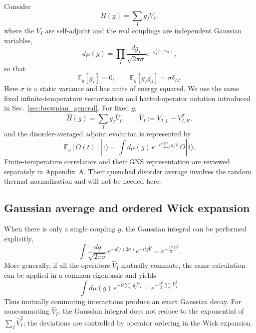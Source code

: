\documentclass{article}
\theoremstyle{definition}
\begin{document}
Consider
\begin{equation}
    H(g)=\sum_I g_IV_I,
\end{equation}
where the $V_I$ are self-adjoint and the real couplings are independent
Gaussian variables,
\begin{equation}
    d\mu(g)
    =\prod_I\frac{dg_I}{\sqrt{2\pi\sigma}}
      e^{-g_I^2/(2\sigma)},
\end{equation}
so that
\begin{equation}
    \mathbb E_g[g_I]=0,
    \qquad
    \mathbb E_g[g_Ig_J]=\sigma\delta_{IJ}.
\end{equation}
Here $\sigma$ is a static variance and has units of energy squared.  We use
the same fixed infinite-temperature vectorization and hatted-operator
notation introduced in Sec.~\ref{sec:brownian_general}.  For fixed $g$,
\begin{equation}
    \widehat H(g)=\sum_Ig_I\widehat V_I,
    \qquad
    \widehat V_I:=V_{I,L}-V_{I,R}^T,
\end{equation}
and the disorder-averaged adjoint evolution is represented by
\begin{equation}
    \mathbb E_g[O(t)]|1\rangle
    =\int d\mu(g)\,
      e^{-it\sum_Ig_I\widehat V_I}O|1\rangle.
\end{equation}
Finite-temperature correlators and their GNS representation are reviewed
separately in Appendix~A.  Their quenched disorder average involves the
random thermal normalization and will not be needed here.

\subsection{Gaussian average and ordered Wick expansion}

When there is only a single coupling $g$, the Gaussian integral can be
performed explicitly,
\begin{equation}
    \int\frac{dg}{\sqrt{2\pi\sigma}}
    e^{-g^2/(2\sigma)}e^{-itg\widehat V}
    =e^{-\frac{\sigma t^2}{2}\widehat V^2}.
\end{equation}
More generally, if all the operators $\widehat V_I$ mutually commute, the
same calculation can be applied in a common eigenbasis and yields
\begin{equation}
    \int d\mu(g)\,
    e^{-it\sum_Ig_I\widehat V_I}
    =
    e^{-\frac{\sigma t^2}{2}\sum_I\widehat V_I^2}.
\end{equation}
Thus mutually commuting interactions produce an exact Gaussian decay.
For noncommuting $\widehat V_I$, the Gaussian integral does not reduce to
the exponential of $\sum_I\widehat V_I^2$; the deviations are controlled
by operator ordering in the Wick expansion.
\end{document}

